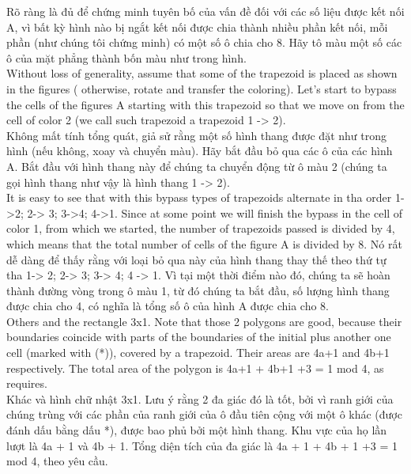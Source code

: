 \begin{ex}
{Rõ ràng là đủ để chứng minh tuyên bố của vấn đề đối với các số liệu được kết nối A, vì bất kỳ hình nào bị ngắt kết nối được chia thành nhiều phần kết nối, mỗi phần (như chúng tôi chứng minh) có một số ô chia cho 8. Hãy tô màu một số các ô của mặt phẳng thành bốn màu như trong hình.\\

Without loss of generality, assume that some of the trapezoid is placed as shown in the figures ( otherwise, rotate and transfer the coloring). Let’s start to bypass the cells of the figures A starting with this trapezoid so that we move on from the cell of  color 2 (we call such trapezoid a trapezoid 1 -> 2). \\
Không mất tính tổng quát, giả sử rằng một số hình thang được đặt như trong hình (nếu không, xoay và chuyển màu). Hãy bắt đầu bỏ qua các ô của các hình A. Bắt đầu với hình thang này để chúng ta chuyển động từ ô màu 2 (chúng ta gọi hình thang như vậy là hình thang 1 -> 2).\\

It is easy to see that with this bypass  types of trapezoids alternate in tha order 1->2; 2-> 3; 3->4; 4->1. Since at some point we will finish the bypass in the cell of color 1, from which we started, the number of trapezoids passed is divided by 4, which means that the total number of cells of the figure A is divided by 8.
Nó rất dễ dàng để thấy rằng với loại bỏ qua này của hình thang thay thế theo thứ tự tha 1-> 2; 2-> 3; 3-> 4; 4 -> 1. Vì tại một thời điểm nào đó, chúng ta sẽ hoàn thành đường vòng trong ô màu 1, từ đó chúng ta bắt đầu, số lượng hình thang được chia cho 4, có nghĩa là tổng số ô của hình A được chia cho 8.\\

Others and the rectangle 3x1. Note that those 2 polygons are good, because their boundaries coincide with parts of the boundaries of the initial plus another one cell (marked with (*)), covered by a trapezoid. Their areas are 4a+1 and 4b+1 respectively. The total area of the polygon is 4a+1 + 4b+1 +3 = 1 mod 4, as requires.\\

Khác và hình chữ nhật 3x1. Lưu ý rằng 2 đa giác đó là tốt, bởi vì ranh giới của chúng trùng với các phần của ranh giới của ô đầu tiên cộng với một ô khác (được đánh dấu bằng dấu *), được bao phủ bởi một hình thang. Khu vực của họ lần lượt là 4a + 1 và 4b + 1. Tổng diện tích của đa giác là 4a + 1 + 4b + 1 +3 = 1 mod 4, theo yêu cầu.\\

	}
\end{ex}

